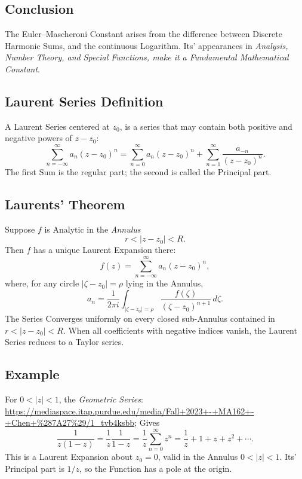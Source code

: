 \documentclass[a4paper, 10pt, onepage]{elegantbook}
\begin{document}
{\subsection{Conclusion}

The Euler--Mascheroni Constant arises from the difference between Discrete Harmonic Sums, and the continuous Logarithm. 
Its' appearances in \emph{Analysis, Number Theory, and Special Functions, make it a Fundamental Mathematical Constant}.



\subsection{Laurent Series Definition}

A Laurent Series centered at \(z_0\), is a series that may contain both positive and negative powers of \(z-z_0\):
\[
\sum_{n=-\infty}^{\infty} a_n(z-z_0)^n
=
\sum_{n=0}^{\infty}a_n(z-z_0)^n
+
\sum_{n=1}^{\infty}\frac{a_{-n}}{(z-z_0)^n}.
\]
The first Sum is the regular part; the second is called the Principal part.

\subsection{Laurents' Theorem}

Suppose \(f\) is Analytic in the \emph{Annulus}
\[
r<|z-z_0|<R.
\]
Then \(f\) has a unique Laurent Expansion there:
\[
f(z)=\sum_{n=-\infty}^{\infty}a_n(z-z_0)^n,
\]
where, for any circle \(|\zeta-z_0|=\rho\) lying in the Annulus,
\[
a_n=
\frac{1}{2\pi i}
\int_{|\zeta-z_0|=\rho}
\frac{f(\zeta)}{(\zeta-z_0)^{n+1}}\,d\zeta.
\]
The Series Converges uniformly on every closed sub-Annulus contained in \(r<|z-z_0|<R\). When all coefficients with 
negative indices vanish, the Laurent Series reduces to a Taylor series.

\subsection{Example}

For \(0<|z|<1\), the \emph{Geometric Series}: 
\url{https://mediaspace.itap.purdue.edu/media/Fall+2023+-+MA162+-+Chen+%287A27%29/1_tvb4ksbb}; Gives
\[
\frac{1}{z(1-z)}
=\frac{1}{z}\frac{1}{1-z}
=\frac{1}{z}\sum_{n=0}^{\infty}z^n
=\frac{1}{z}+1+z+z^2+\cdots.
\]
This is a Laurent Expansion about \(z_0=0\), valid in the Annulus \(0<|z|<1\). Its' Principal part is \(1/z\), so the 
Function has a pole at the origin.

}
\end{document}
